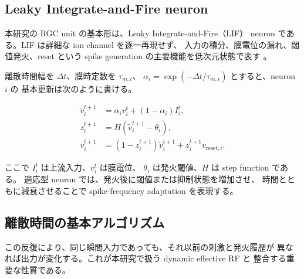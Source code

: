 \documentclass[a4paper,10pt,twocolumn,uplatex,dvipdfmx]{jsarticle}
\begin{document}
\subsection{Leaky Integrate-and-Fire neuron}

本研究の RGC unit の基本形は、Leaky Integrate-and-Fire（LIF）
neuron である。LIF は詳細な ion channel を逐一再現せず、
入力の積分、膜電位の漏れ、閾値発火、reset という
spike generation の主要機能を低次元状態で表す
\cite{gerstner2014}。

離散時間幅を $\Delta t$、膜時定数を $\tau_{m,i}$、
$\alpha_i=\exp(-\Delta t/\tau_{m,i})$ とすると、neuron $i$ の
基本更新は次のように書ける。

\begin{align}
  \widetilde{v}_i^{t+1}
  &= \alpha_i v_i^t + (1-\alpha_i)I_i^t, \\
  z_i^{t+1}
  &= H(\widetilde{v}_i^{t+1}-\theta_i), \\
  v_i^{t+1}
  &= (1-z_i^{t+1})\widetilde{v}_i^{t+1}
     + z_i^{t+1}v_{\mathrm{reset},i}.
\end{align}

ここで $I_i^t$ は上流入力、$v_i^t$ は膜電位、
$\theta_i$ は発火閾値、$H$ は step function である。
適応型 neuron では、発火後に閾値または抑制状態を増加させ、
時間とともに減衰させることで spike-frequency adaptation を表現する。

\subsection{離散時間の基本アルゴリズム}

\noindent{}

この反復により、同じ瞬間入力であっても、それ以前の刺激と発火履歴が
異なれば出力が変化する。これが本研究で扱う dynamic effective RF と
整合する重要な性質である。
\end{document}
